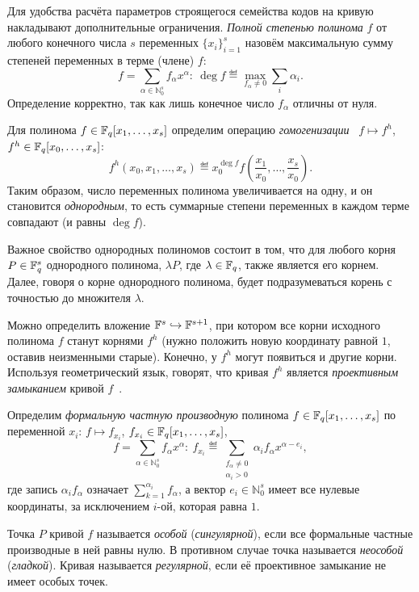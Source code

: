 \documentclass[14pt]{extarticle}
\begin{document}
Для удобства расчёта параметров строящегося семейства кодов на кривую
накладывают дополнительные ограничения. \emph{Полной степенью полинома} $f$ от
любого конечного числа $s$ переменных $\{x_i\}_{i=1}^s$ назовём максимальную
сумму степеней переменных в терме (члене) $f$: 
$$ f = \sum_{\alpha \in \mathbb N_0^s} f_\alpha x^\alpha:\: 
\deg f \eqdef \max_{f_\alpha \neq 0} \sum_i \alpha_i.$$
Определение корректно, так как лишь конечное число $f_\alpha$ отличны от нуля.

Для полинома $f\in\mathbb F_q[x_1, \ldots, x_s]$ определим операцию 
\emph{гомогенизации}~\cite{Cox00} 
$f \mapsto f^h$, $f^h\in\mathbb F_q[x_0, \ldots,x_s]$: 
$$ f^h(x_0, x_1, \ldots, x_s) \eqdef x_0^{\deg f}f\left(\frac {x_1} {x_0}, \ldots, 
\frac {x_s} {x_0} \right). $$
Таким образом, число переменных полинома увеличивается на одну, и он становится
\emph{однородным}, то есть суммарные степени переменных в каждом терме совпадают
(и равны $\deg f$).
 
Важное свойство однородных полиномов состоит в том, что для любого корня
$P\in\mathbb F_q^s$ однородного полинома, $\lambda P$, где $\lambda\in\mathbb F_q$, также
является его корнем. Далее, говоря о корне однородного полинома, будет
подразумеваться корень с точностью до множителя $\lambda$.

Можно определить вложение $\mathbb F^s \hookrightarrow \mathbb F^{s+1}$, при
котором все корни исходного полинома $f$ станут корнями $f^h$ (нужно положить
новую координату равной $1$, оставив неизменными старые). Конечно, у $f^h$ могут
появиться и другие корни. Используя геометрический язык, говорят, что кривая
$f^h$ является \emph{проективным замыканием} кривой $f$~\cite{Cox00}.

Определим \emph{формальную частную производную} полинома $f \in \mathbb F_q[x_1,
\ldots, x_s]$ по переменной $x_i$: 
$f \mapsto f_{x_i}$, $f_{x_i}\in \mathbb F_q[x_1, \ldots, x_s]$,
$$ f = \sum_{\alpha \in \mathbb N_0^s} f_\alpha x^\alpha: \: 
	f_{x_i} \eqdef \sum_{\substack{f_\alpha \neq 0\\ \alpha_i > 0}} 
	\alpha_i f_\alpha x^{\alpha - e_i},$$
где запись $\alpha_i f_\alpha$ означает $\sum_{k=1}^{\alpha_i}f_\alpha$, а 
вектор $e_i\in\mathbb N_0^s$ имеет все нулевые координаты, за исключением $i$-ой,
которая равна $1$.

Точка $P$ кривой $f$ называется \emph{особой} (\emph{сингулярной}), если все
формальные частные производные в ней равны нулю. В противном случае точка
называется \emph{неособой} (\emph{гладкой}). Кривая называется
\emph{регулярной}, если её проективное замыкание не имеет особых точек.
\end{document}
